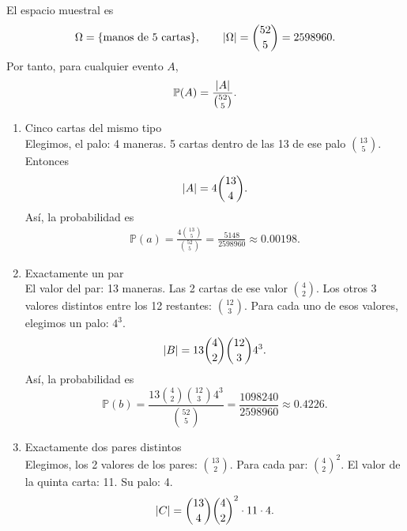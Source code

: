 \documentclass[12pt,a4paper]{article}
\begin{document}
    \begin{solucion}
        El espacio muestral es
        \begin{align*}
            \Omega=\{\text{manos de 5 cartas}\},\qquad \abs{\Omega}=\binom{52}{5}=2598960.
        \end{align*}
        Por tanto, para cualquier evento $A$,
        \begin{equation*}
            \mathbb{P}(A)=\frac{\abs{A}}{\binom{52}{5}}.
        \end{equation*}
        \begin{enumerate}
            \item[(a)] Cinco cartas del mismo tipo\\
            Elegimos, el palo: 4 maneras. 5 cartas dentro de las 13 de ese palo $\binom{13}{5}$.
            Entonces
            \begin{align*}
                \abs{A}=4\binom{13}{4}.
            \end{align*}
            Así, la probabilidad es
            \begin{align*}
                \mathbb{P}(a)=\frac{4\binom{13}{5}}{\binom{52}{5}}=\frac{5148}{2598960}\approx0.00198.
            \end{align*}
            \item[(b)] Exactamente un par\\
            El valor del par: 13 maneras. Las 2 cartas de ese valor $\binom{4}{2}$. Los otros 3 valores distintos entre los 12 restantes: $\binom{12}{3}$.
            Para cada uno de esos valores, elegimos un palo: $4^{3}$.
            \begin{equation*}
                \abs{B}=13\binom{4}{2}\binom{12}{3}4^{3}.
            \end{equation*}
            Así, la probabilidad es
            \begin{equation*}
                \mathbb{P}(b)=\frac{13\binom{4}{2}\binom{12}{3}4^{3}}{\binom{52}{5}}=\frac{1098240}{2598960}\approx0.4226.
            \end{equation*}
            \item[(c)] Exactamente dos pares distintos\\
            Elegimos, los 2 valores de los pares: $\binom{13}{2}$. Para cada par: $\binom{4}{2}^{2}$.
            El valor de la quinta carta: 11. Su palo: 4.
            \begin{equation*}
                \abs{C}=\binom{13}{4}\binom{4}{2}^{2}\cdot11\cdot4.
            \end{equation*}

\end{enumerate}
\end{solucion}
\end{document}
